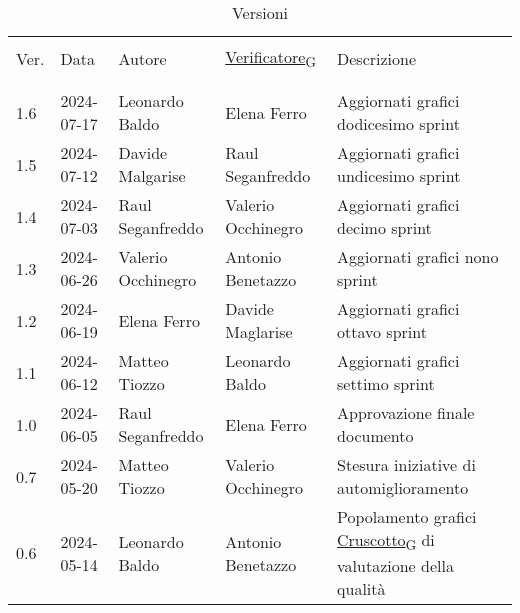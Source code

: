 \documentclass[italian,12pt]{article} %
\begin{document}

\newpage

\captionsetup[table]{list=no}
\begin{table}[!h]
	\caption*{Versioni}
	\footnotesize
	\begin{center}
		\begin{tabular}{ l l l l p{6cm} }
			\hline                                                                                                                   \\[-2ex]
			Ver. & Data       & Autore             & \href{https://7last.github.io/docs/pb/documentazione-interna/glossario\#verificatore}{Verificatore\textsubscript{G}}       & Descrizione                                                \\
			\\[-2ex] \hline \\[-1.5ex]
			1.6  & 2024-07-17 & Leonardo Baldo     & Elena Ferro        & Aggiornati grafici dodicesimo sprint \\
			1.5  & 2024-07-12 & Davide Malgarise   & Raul Seganfreddo   & Aggiornati grafici undicesimo sprint \\
			1.4  & 2024-07-03 & Raul Seganfreddo   & Valerio Occhinegro & Aggiornati grafici decimo sprint \\
			1.3  & 2024-06-26 & Valerio Occhinegro & Antonio Benetazzo  & Aggiornati grafici nono sprint \\
			1.2  & 2024-06-19 & Elena Ferro        & Davide Maglarise   & Aggiornati grafici ottavo sprint \\
			1.1  & 2024-06-12 & Matteo Tiozzo      & Leonardo Baldo     & Aggiornati grafici settimo sprint \\
			1.0  & 2024-06-05 & Raul Seganfreddo   & Elena Ferro        & Approvazione finale documento                              \\
			0.7  & 2024-05-20 & Matteo Tiozzo      & Valerio Occhinegro & Stesura iniziative di automiglioramento                    \\
			0.6  & 2024-05-14 & Leonardo Baldo     & Antonio Benetazzo  & Popolamento grafici \href{https://7last.github.io/docs/pb/documentazione-interna/glossario\#cruscotto}{Cruscotto\textsubscript{G}} di valutazione della qualità \\

\end{tabular}
\end{center}
\end{table}
\end{document}
